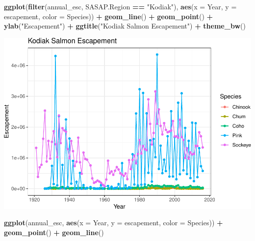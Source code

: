 \documentclass[]{article}
\newenvironment{Shaded}{\begin{snugshade}}{\end{snugshade}}
\newcommand{\DataTypeTok}[1]{\textcolor[rgb]{0.13,0.29,0.53}{#1}}
\newcommand{\KeywordTok}[1]{\textcolor[rgb]{0.13,0.29,0.53}{\textbf{#1}}}
\newcommand{\NormalTok}[1]{#1}
\newcommand{\OperatorTok}[1]{\textcolor[rgb]{0.81,0.36,0.00}{\textbf{#1}}}
\newcommand{\StringTok}[1]{\textcolor[rgb]{0.31,0.60,0.02}{#1}}
\begin{document}
\begin{Shaded}
\begin{Highlighting}[]
\KeywordTok{ggplot}\NormalTok{(}\KeywordTok{filter}\NormalTok{(annual_esc, SASAP.Region }\OperatorTok{==}\StringTok{ "Kodiak"}\NormalTok{), }\KeywordTok{aes}\NormalTok{(}\DataTypeTok{x =}\NormalTok{ Year, }\DataTypeTok{y =}\NormalTok{ escapement, }\DataTypeTok{color =}\NormalTok{ Species)) }\OperatorTok{+}\StringTok{ }
\StringTok{    }\KeywordTok{geom_line}\NormalTok{() }\OperatorTok{+}
\StringTok{    }\KeywordTok{geom_point}\NormalTok{() }\OperatorTok{+}
\StringTok{    }\KeywordTok{ylab}\NormalTok{(}\StringTok{"Escapement"}\NormalTok{) }\OperatorTok{+}
\StringTok{    }\KeywordTok{ggtitle}\NormalTok{(}\StringTok{"Kodiak Salmon Escapement"}\NormalTok{) }\OperatorTok{+}
\StringTok{    }\KeywordTok{theme_bw}\NormalTok{()}
\end{Highlighting}
\end{Shaded}

\includegraphics{Rmarkdown_files/figure-latex/unnamed-chunk-8-1.pdf}

\begin{Shaded}
\begin{Highlighting}[]
\KeywordTok{ggplot}\NormalTok{(annual_esc, }\KeywordTok{aes}\NormalTok{(}\DataTypeTok{x =}\NormalTok{ Year, }\DataTypeTok{y =}\NormalTok{ escapement, }\DataTypeTok{color =}\NormalTok{ Species)) }\OperatorTok{+}
\StringTok{  }\KeywordTok{geom_point}\NormalTok{() }\OperatorTok{+}
\StringTok{  }\KeywordTok{geom_line}\NormalTok{()}
\end{Highlighting}
\end{Shaded}
\end{document}
